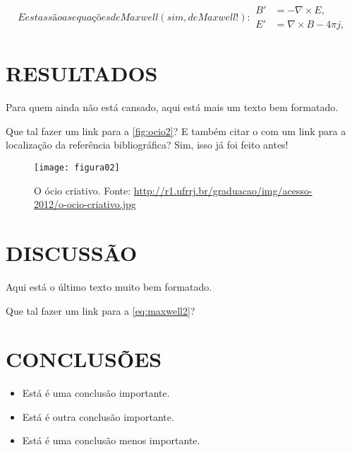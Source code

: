 \begin{subequations}\label{eq:maxwell2}
E estas são as equações de Maxwell (sim, de Maxwell!):
\begin{align}
        B'&=-\nabla \times E,\\
        E'&=\nabla \times B - 4\pi j,
\end{align}
\end{subequations}

\section{RESULTADOS}

Para quem ainda não está cansado, aqui está mais um texto bem formatado. 
\blindtext[1]

Que tal fazer um link para a \autoref{fig:ocio2}? E também citar o 
 com um link para a localização da referência 
bibliográfica? Sim, isso já foi feito antes!

\begin{figure}[!ht]
\label{fig:ocio2}
\centering
\texttt{[image: figura02]}
\caption[O ócio criativo.]{O ócio criativo. Fonte: 
\url{http://r1.ufrrj.br/graduacao/img/acesso-2012/o-ocio-criativo.jpg}}
\end{figure}

\section{DISCUSSÃO}

Aqui está o último texto muito bem formatado. \blindtext[2]

Que tal fazer um link para a \autoref{eq:maxwell2}?

\section{CONCLUSÕES}

\begin{itemize}
  \item Está é uma conclusão importante.
  \item Está é outra conclusão importante.
  \item Está é uma conclusão menos importante.
\end{itemize}
